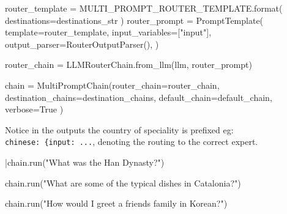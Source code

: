 \documentclass[
  letterpaper,
  DIV=11,
  numbers=noendperiod]{scrreprt}
\newenvironment{Shaded}{\begin{snugshade}}{\end{snugshade}}
\newcommand{\BuiltInTok}[1]{\textcolor[rgb]{0.00,0.23,0.31}{#1}}
\newcommand{\NormalTok}[1]{\textcolor[rgb]{0.00,0.23,0.31}{#1}}
\newcommand{\OperatorTok}[1]{\textcolor[rgb]{0.37,0.37,0.37}{#1}}
\newcommand{\StringTok}[1]{\textcolor[rgb]{0.13,0.47,0.30}{#1}}
\newcommand{\VariableTok}[1]{\textcolor[rgb]{0.07,0.07,0.07}{#1}}
\begin{document}
\begin{Shaded}
\begin{Highlighting}[]
\NormalTok{router\_template }\OperatorTok{=}\NormalTok{ MULTI\_PROMPT\_ROUTER\_TEMPLATE.}\BuiltInTok{format}\NormalTok{(}
\NormalTok{    destinations}\OperatorTok{=}\NormalTok{destinations\_str}
\NormalTok{)}
\NormalTok{router\_prompt }\OperatorTok{=}\NormalTok{ PromptTemplate(}
\NormalTok{    template}\OperatorTok{=}\NormalTok{router\_template,}
\NormalTok{    input\_variables}\OperatorTok{=}\NormalTok{[}\StringTok{"input"}\NormalTok{],}
\NormalTok{    output\_parser}\OperatorTok{=}\NormalTok{RouterOutputParser(),}
\NormalTok{)}

\NormalTok{router\_chain }\OperatorTok{=}\NormalTok{ LLMRouterChain.from\_llm(llm, router\_prompt)}
\end{Highlighting}
\end{Shaded}

\begin{Shaded}
\begin{Highlighting}[]
\NormalTok{chain }\OperatorTok{=}\NormalTok{ MultiPromptChain(router\_chain}\OperatorTok{=}\NormalTok{router\_chain,}
\NormalTok{                         destination\_chains}\OperatorTok{=}\NormalTok{destination\_chains,}
\NormalTok{                         default\_chain}\OperatorTok{=}\NormalTok{default\_chain, verbose}\OperatorTok{=}\VariableTok{True}
\NormalTok{                        )}
\end{Highlighting}
\end{Shaded}

Notice in the outputs the country of speciality is prefixed eg:
\texttt{chinese:\ \{\textquotesingle{}input\textquotesingle{}:\ ...},
denoting the routing to the correct expert.

\begin{Shaded}
\begin{Highlighting}[]
\OperatorTok{|}\NormalTok{chain.run(}\StringTok{"What was the Han Dynasty?"}\NormalTok{)}
\end{Highlighting}
\end{Shaded}

\begin{Shaded}
\begin{Highlighting}[]
\NormalTok{chain.run(}\StringTok{"What are some of the typical dishes in Catalonia?"}\NormalTok{)}
\end{Highlighting}
\end{Shaded}

\begin{Shaded}
\begin{Highlighting}[]
\NormalTok{chain.run(}\StringTok{"How would I greet a friend\textquotesingle{}s family in Korean?"}\NormalTok{)}
\end{Highlighting}
\end{Shaded}
\end{document}
